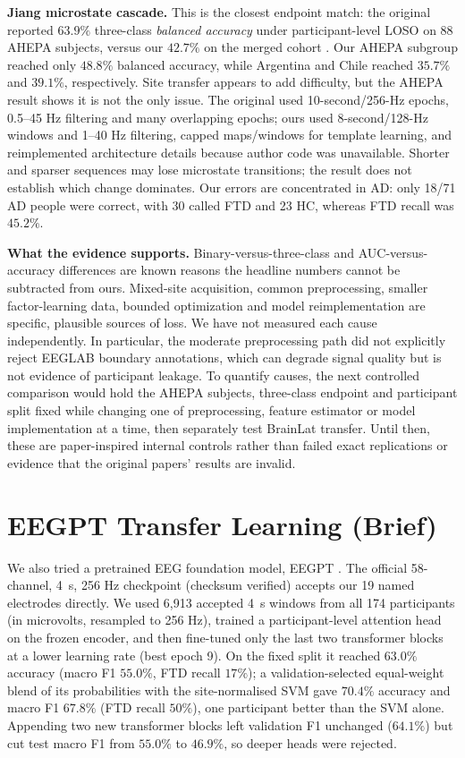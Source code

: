 \documentclass[10pt,twocolumn,a4paper]{article}
\begin{document}
\noindent\textbf{Jiang microstate cascade.} This is the closest endpoint match: the original reported $63.9\%$ three-class \emph{balanced accuracy} under participant-level LOSO on 88 AHEPA subjects, versus our $42.7\%$ on the merged cohort \cite{jiang2026}. Our AHEPA subgroup reached only $48.8\%$ balanced accuracy, while Argentina and Chile reached $35.7\%$ and $39.1\%$, respectively. Site transfer appears to add difficulty, but the AHEPA result shows it is not the only issue. The original used 10-second/256-Hz epochs, 0.5--45 Hz filtering and many overlapping epochs; ours used 8-second/128-Hz windows and 1--40 Hz filtering, capped maps/windows for template learning, and reimplemented architecture details because author code was unavailable. Shorter and sparser sequences may lose microstate transitions; the result does not establish which change dominates. Our errors are concentrated in AD: only 18/71 AD people were correct, with 30 called FTD and 23 HC, whereas FTD recall was $45.2\%$.

\noindent\textbf{What the evidence supports.} Binary-versus-three-class and AUC-versus-accuracy differences are known reasons the headline numbers cannot be subtracted from ours. Mixed-site acquisition, common preprocessing, smaller factor-learning data, bounded optimization and model reimplementation are specific, plausible sources of loss. We have not measured each cause independently. In particular, the moderate preprocessing path did not explicitly reject EEGLAB boundary annotations, which can degrade signal quality but is not evidence of participant leakage. To quantify causes, the next controlled comparison would hold the AHEPA subjects, three-class endpoint and participant split fixed while changing one of preprocessing, feature estimator or model implementation at a time, then separately test BrainLat transfer. Until then, these are paper-inspired internal controls rather than failed exact replications or evidence that the original papers' results are invalid.

\section{EEGPT Transfer Learning (Brief)}
\label{sec:eegpt}
We also tried a pretrained EEG foundation model, EEGPT \cite{wang2024}. The official 58-channel, 4~s, 256 Hz checkpoint (checksum verified) accepts our 19 named electrodes directly. We used 6,913 accepted 4~s windows from all 174 participants (in microvolts, resampled to 256 Hz), trained a participant-level attention head on the frozen encoder, and then fine-tuned only the last two transformer blocks at a lower learning rate (best epoch 9). On the fixed split it reached $63.0\%$ accuracy (macro F1 $55.0\%$, FTD recall $17\%$); a validation-selected equal-weight blend of its probabilities with the site-normalised SVM gave $70.4\%$ accuracy and macro F1 $67.8\%$ (FTD recall $50\%$), one participant better than the SVM alone. Appending two new transformer blocks left validation F1 unchanged ($64.1\%$) but cut test macro F1 from $55.0\%$ to $46.9\%$, so deeper heads were rejected.
\end{document}
